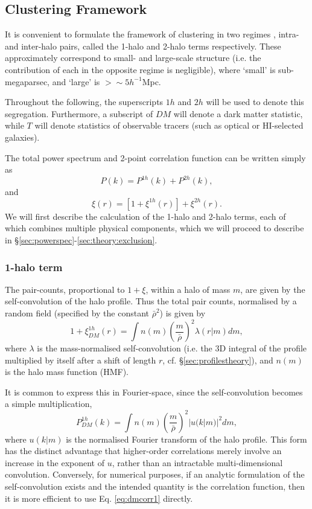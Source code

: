 \documentclass[5p,aas_macros]{elsarticle}
\begin{document}
\subsection{Clustering Framework}
\label{sec:haloclustering}
It is convenient to formulate the framework of clustering in two regimes \citep{Seljak2000}, intra- and inter-halo pairs, called the 1-halo and 2-halo terms respectively. These approximately correspond to small- and large-scale structure (i.e. the contribution of each in the opposite regime is negligible), where `small' is sub-megaparsec, and `large' is $>\sim5h^{-1}$Mpc. 

Throughout the following, the superscripts $1h$ and $2h$ will be used to denote this segregation. Furthermore, a subscript of $DM$ will denote a dark matter statistic, while $T$ will denote statistics of observable tracers (such as optical or HI-selected galaxies). 

The total power spectrum and 2-point correlation function can be written simply as
\begin{equation}
    P(k) = P^{1h}(k) + P^{2h}(k),
\end{equation}
and
\begin{equation}
    \xi(r) = [1 + \xi^{1h}(r)] + \xi^{2h}(r).
\end{equation}
We will first describe the calculation of the 1-halo and 2-halo terms, each of which combines multiple physical components, which we will proceed to describe in 
\S\ref{sec:powerspec}-\ref{sec:theory:exclusion}.

\subsubsection{1-halo term}
The pair-counts, proportional to $1+\xi$, within a halo of mass $m$, are given by the self-convolution of the halo profile. Thus the total pair counts, normalised by a random field (specified by the constant $\bar{\rho}^2$) is given by
\begin{equation}
\label{eq:dmcorr1}
1 + \xi_{DM}^{1h}(r) = \int n(m) \left(\frac{m}{\bar{\rho}}\right)^2 \lambda(r|m) dm,
\end{equation}
where $\lambda$ is the mass-normalised self-convolution (i.e. the 3D integral of the profile multiplied by itself after a shift of length $r$, cf. \S\ref{sec:profilestheory}), and $n(m)$ is the halo mass function (HMF).

It is common to express this in Fourier-space, since the self-convolution becomes a simple multiplication,
\begin{equation}
    \label{eq:dmpower1}
    P_{DM}^{1h}(k) = \int n(m) \left(\frac{m}{\bar{\rho}}\right)^2 |u(k|m)|^2 dm,
\end{equation} 
where $u(k|m)$ is the normalised Fourier transform of the halo profile. This form has the distinct advantage that higher-order correlations merely involve an increase in the exponent of $u$, rather than an intractable multi-dimensional convolution. Conversely, for numerical purposes, if an analytic formulation of the self-convolution exists and the intended quantity is the correlation function, then it is more efficient to use Eq. \ref{eq:dmcorr1} directly. 
\end{document}
